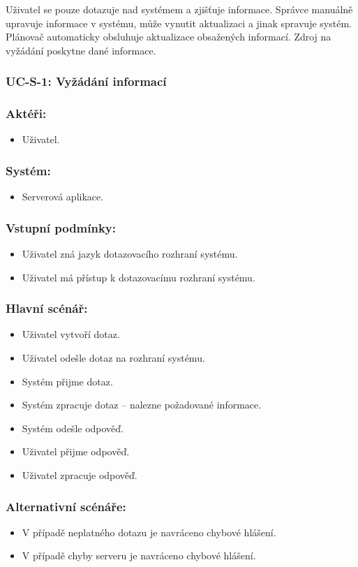 Uživatel se pouze dotazuje nad systémem a zjišťuje informace. Správce manuálně upravuje informace v systému, může vynutit aktualizaci a jinak spravuje systém. Plánovač automaticky obsluhuje aktualizace obsažených informací. Zdroj na vyžádání poskytne dané informace.

\subsubsection{UC-S-1: Vyžádání informací}
\subsubsection*{Aktéři:}
\begin{itemize}
 \item Uživatel.
\end{itemize}
\subsubsection*{Systém:}
\begin{itemize}
 \item Serverová aplikace.
\end{itemize}
\subsubsection*{Vstupní podmínky:}
\begin{itemize}
 \item Uživatel zná jazyk dotazovacího rozhraní systému.
 \item Uživatel má přístup k dotazovacímu rozhraní systému.
\end{itemize}
\subsubsection*{Hlavní scénář:}
\begin{itemize}
 \item Uživatel vytvoří dotaz.
 \item Uživatel odešle dotaz na rozhraní systému.
 \item Systém přijme dotaz.
 \item Systém zpracuje dotaz -- nalezne požadované informace.
 \item Systém odešle odpověď.
 \item Uživatel přijme odpověď.
 \item Uživatel zpracuje odpověď.
\end{itemize}
\subsubsection*{Alternativní scénáře:}
\begin{itemize}
 \item V případě neplatného dotazu je navráceno chybové hlášení.
 \item V případě chyby serveru je navráceno chybové hlášení.
\end{itemize}

